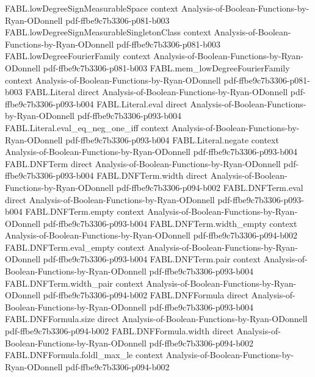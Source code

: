 \begin{theorem}
  {FABL.lowDegreeSignMeasurableSpace}
  {context}
  {Analysis-of-Boolean-Functions-by-Ryan-ODonnell}
  {pdf-ffbe9c7b3306-p081-b003}
\proofstep
  {FABL.lowDegreeSignMeasurableSingletonClass}
  {context}
  {Analysis-of-Boolean-Functions-by-Ryan-ODonnell}
  {pdf-ffbe9c7b3306-p081-b003}
\proofstep
  {FABL.lowDegreeFourierFamily}
  {context}
  {Analysis-of-Boolean-Functions-by-Ryan-ODonnell}
  {pdf-ffbe9c7b3306-p081-b003}
\proofstep
  {FABL.mem_lowDegreeFourierFamily}
  {context}
  {Analysis-of-Boolean-Functions-by-Ryan-ODonnell}
  {pdf-ffbe9c7b3306-p081-b003}
\proofstep
  {FABL.Literal}
  {direct}
  {Analysis-of-Boolean-Functions-by-Ryan-ODonnell}
  {pdf-ffbe9c7b3306-p093-b004}
\proofstep
  {FABL.Literal.eval}
  {direct}
  {Analysis-of-Boolean-Functions-by-Ryan-ODonnell}
  {pdf-ffbe9c7b3306-p093-b004}
\proofstep
  {FABL.Literal.eval_eq_neg_one_iff}
  {context}
  {Analysis-of-Boolean-Functions-by-Ryan-ODonnell}
  {pdf-ffbe9c7b3306-p093-b004}
\proofstep
  {FABL.Literal.negate}
  {context}
  {Analysis-of-Boolean-Functions-by-Ryan-ODonnell}
  {pdf-ffbe9c7b3306-p093-b004}
\proofstep
  {FABL.DNFTerm}
  {direct}
  {Analysis-of-Boolean-Functions-by-Ryan-ODonnell}
  {pdf-ffbe9c7b3306-p093-b004}
\proofstep
  {FABL.DNFTerm.width}
  {direct}
  {Analysis-of-Boolean-Functions-by-Ryan-ODonnell}
  {pdf-ffbe9c7b3306-p094-b002}
\proofstep
  {FABL.DNFTerm.eval}
  {direct}
  {Analysis-of-Boolean-Functions-by-Ryan-ODonnell}
  {pdf-ffbe9c7b3306-p093-b004}
\proofstep
  {FABL.DNFTerm.empty}
  {context}
  {Analysis-of-Boolean-Functions-by-Ryan-ODonnell}
  {pdf-ffbe9c7b3306-p093-b004}
\proofstep
  {FABL.DNFTerm.width_empty}
  {context}
  {Analysis-of-Boolean-Functions-by-Ryan-ODonnell}
  {pdf-ffbe9c7b3306-p094-b002}
\proofstep
  {FABL.DNFTerm.eval_empty}
  {context}
  {Analysis-of-Boolean-Functions-by-Ryan-ODonnell}
  {pdf-ffbe9c7b3306-p093-b004}
\proofstep
  {FABL.DNFTerm.pair}
  {context}
  {Analysis-of-Boolean-Functions-by-Ryan-ODonnell}
  {pdf-ffbe9c7b3306-p093-b004}
\proofstep
  {FABL.DNFTerm.width_pair}
  {context}
  {Analysis-of-Boolean-Functions-by-Ryan-ODonnell}
  {pdf-ffbe9c7b3306-p094-b002}
\proofstep
  {FABL.DNFFormula}
  {direct}
  {Analysis-of-Boolean-Functions-by-Ryan-ODonnell}
  {pdf-ffbe9c7b3306-p093-b004}
\proofstep
  {FABL.DNFFormula.size}
  {direct}
  {Analysis-of-Boolean-Functions-by-Ryan-ODonnell}
  {pdf-ffbe9c7b3306-p094-b002}
\proofstep
  {FABL.DNFFormula.width}
  {direct}
  {Analysis-of-Boolean-Functions-by-Ryan-ODonnell}
  {pdf-ffbe9c7b3306-p094-b002}
\proofstep
  {FABL.DNFFormula.foldl_max_le}
  {context}
  {Analysis-of-Boolean-Functions-by-Ryan-ODonnell}
  {pdf-ffbe9c7b3306-p094-b002}

\end{theorem}
